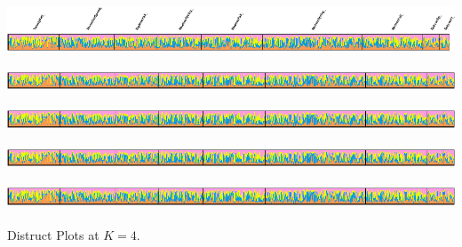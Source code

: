 \documentclass[11pt]{article}
\newlength{\nameraise}
\begin{document}
\includegraphics{./final_pdf//BB_ds_Clumped_TopLabel_k004r001.pdf}~\hspace{-1.1ex} \\
\includegraphics{./final_pdf//BB_ds_Clumped_NoLabel_k004r002.pdf}~ \\
\includegraphics{./final_pdf//BB_ds_Clumped_NoLabel_k004r003.pdf}~ \\
\includegraphics{./final_pdf//BB_ds_Clumped_NoLabel_k004r004.pdf}~ \\
\includegraphics{./final_pdf//BB_ds_Clumped_NoLabel_k004r005.pdf}~ \\
Distruct Plots at $K=4$.
\end{document}
